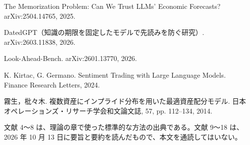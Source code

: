 \documentclass[xelatex,ja=standard,jafont=hiragino-pron,a4paper,10pt]{bxjsreport}
\begin{document}
\begin{enumerate}[label={[\arabic*]},leftmargin=2.4em,itemsep=0.5em]
\item The Memorization Problem: Can We Trust LLMs' Economic Forecasts? arXiv:2504.14765, 2025.
\item DatedGPT（知識の期限を固定したモデルで先読みを防ぐ研究）. arXiv:2603.11838, 2026.
\item Look-Ahead-Bench. arXiv:2601.13770, 2026.
\item K. Kirtac, G. Germano. Sentiment Trading with Large Language Models. Finance Research Letters, 2024.
\item 霧生，枇々木. 複数資産にインプライド分布を用いた最適資産配分モデル. 日本オペレーションズ・リサーチ学会和文論文誌, 57, pp. 112--134, 2014.
\end{enumerate}

文献 4〜8 は、理論の章で使った標準的な方法の出典である。文献 9〜18 は、2026 年 10 月 13 日に要旨と要約を読んだもので、本文を通読してはいない。
\end{document}
